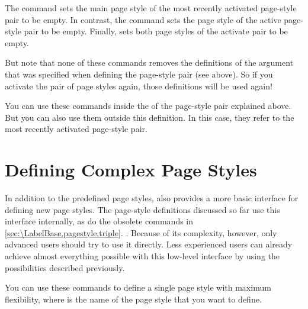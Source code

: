 \begin{Declaration}
\end{Declaration}
The  command sets the main page style of
the most recently activated page-style pair to be empty. In contrast, the
 command sets the  page
style of the active page-style pair to be empty. Finally,
 sets both page styles of the activate pair to be
empty.

But note that none of these commands removes the
definitions of the  argument that was specified when
defining the page-style pair (see above). So if you activate the pair of page
styles again, those definitions will be used again!

You can use these commands inside the  of the page-style
pair explained above. But you can also use them outside this definition. In
this case, they refer to the most recently activated page-style pair.%
\EndIndexGroup


\section{Defining Complex Page Styles}

In addition to the predefined page styles,  also
provides a more basic interface for defining new page styles. The page-style
definitions discussed so far use this interface internally, as do the obsolete
commands in \autoref{sec:\LabelBase.pagestyle.triple}.
. Because of its complexity, however, only advanced
users should try to use it directly. Less experienced users can already
achieve almost everything possible with this low-level interface by using the
possibilities described previously.

\begin{Declaration}
\end{Declaration}
You can use these commands to define a single page style with maximum
flexibility, where  is the name of the page style that you want to
define.

